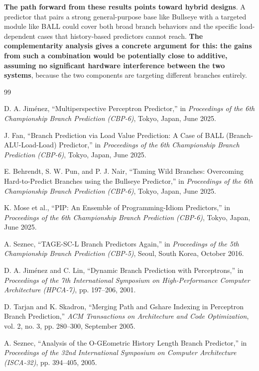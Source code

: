 \documentclass[11pt,a4paper]{article}
\begin{document}
\textbf{The path forward from these results points toward hybrid designs}. A predictor
that pairs a strong general-purpose base like Bullseye with a targeted module 
like BALL could cover both broad branch behaviors and the specific load-dependent
cases that history-based predictors cannot reach. \textbf{The complementarity analysis
gives a concrete argument for this: the gains from such a combination would be
potentially close to additive, assuming no significant hardware interference between
the two systems}, because the two components are targeting different branches
entirely.
\begin{thebibliography}{99}

D. A. Jiménez,
``Multiperspective Perceptron Predictor,''
in \textit{Proceedings of the 6th Championship Branch Prediction (CBP-6)},
Tokyo, Japan, June 2025.

J. Fan,
``Branch Prediction via Load Value Prediction: A Case of BALL 
(Branch-ALU-Load-Load) Predictor,''
in \textit{Proceedings of the 6th Championship Branch Prediction (CBP-6)},
Tokyo, Japan, June 2025.

E. Behrendt, S. W. Pun, and P. J. Nair,
``Taming Wild Branches: Overcoming Hard-to-Predict Branches using the 
Bullseye Predictor,''
in \textit{Proceedings of the 6th Championship Branch Prediction (CBP-6)},
Tokyo, Japan, June 2025.

K. Mose et al.,
``PIP: An Ensemble of Programming-Idiom Predictors,''
in \textit{Proceedings of the 6th Championship Branch Prediction (CBP-6)},
Tokyo, Japan, June 2025.

A. Seznec,
``TAGE-SC-L Branch Predictors Again,''
in \textit{Proceedings of the 5th Championship Branch Prediction (CBP-5)},
Seoul, South Korea, October 2016.

D. A. Jiménez and C. Lin,
``Dynamic Branch Prediction with Perceptrons,''
in \textit{Proceedings of the 7th International Symposium on 
High-Performance Computer Architecture (HPCA-7)},
pp. 197--206, 2001.

D. Tarjan and K. Skadron,
``Merging Path and Gshare Indexing in Perceptron Branch Prediction,''
\textit{ACM Transactions on Architecture and Code Optimization},
vol. 2, no. 3, pp. 280--300, September 2005.

A. Seznec,
``Analysis of the O-GEometric History Length Branch Predictor,''
in \textit{Proceedings of the 32nd International Symposium on 
Computer Architecture (ISCA-32)},
pp. 394--405, 2005.


\end{thebibliography}
\end{document}
